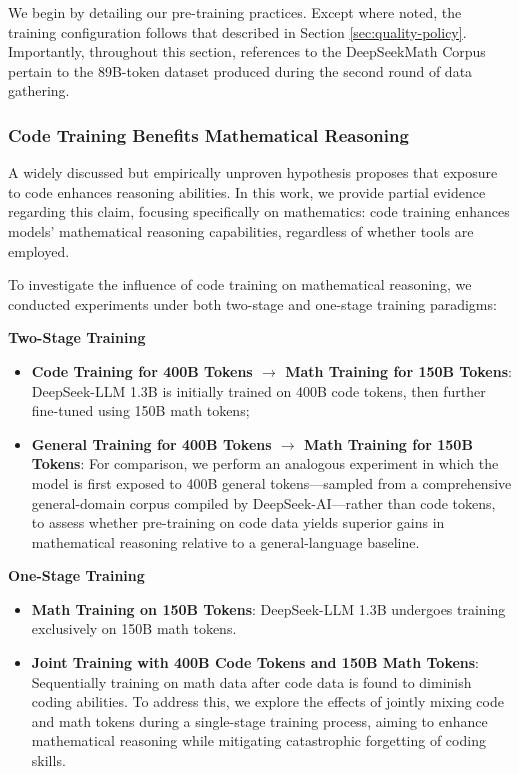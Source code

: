 \begin{itemize}[topsep=0pt]
\begin{itemize}[topsep=0pt]
We begin by detailing our pre-training practices. Except where noted, the training configuration follows that described in Section \ref{sec:quality-policy}. Importantly, throughout this section, references to the DeepSeekMath Corpus pertain to the 89B-token dataset produced during the second round of data gathering.

\subsubsection{Code Training Benefits Mathematical Reasoning}

A widely discussed but empirically unproven hypothesis proposes that exposure to code enhances reasoning abilities. In this work, we provide partial evidence regarding this claim, focusing specifically on mathematics: code training enhances models’ mathematical reasoning capabilities, regardless of whether tools are employed.

To investigate the influence of code training on mathematical reasoning, we conducted experiments under both two-stage and one-stage training paradigms:

\textbf{Two-Stage Training}

\begin{itemize}[topsep=0pt]
    \item \textbf{Code Training for 400B Tokens $\rightarrow$ Math Training for 150B Tokens}: DeepSeek-LLM 1.3B is initially trained on 400B code tokens, then further fine-tuned using 150B math tokens;
    \item \textbf{General Training for 400B Tokens $\rightarrow$ Math Training for 150B Tokens}: For comparison, we perform an analogous experiment in which the model is first exposed to 400B general tokens—sampled from a comprehensive general-domain corpus compiled by DeepSeek-AI—rather than code tokens, to assess whether pre-training on code data yields superior gains in mathematical reasoning relative to a general-language baseline.
\end{itemize}

\textbf{One-Stage Training}

\begin{itemize}[topsep=0pt]
    \item \textbf{Math Training on 150B Tokens}: DeepSeek-LLM 1.3B undergoes training exclusively on 150B math tokens.
    \item \textbf{Joint Training with 400B Code Tokens and 150B Math Tokens}: Sequentially training on math data after code data is found to diminish coding abilities. To address this, we explore the effects of jointly mixing code and math tokens during a single-stage training process, aiming to enhance mathematical reasoning while mitigating catastrophic forgetting of coding skills.
\end{itemize}


\end{itemize}
\end{itemize}
